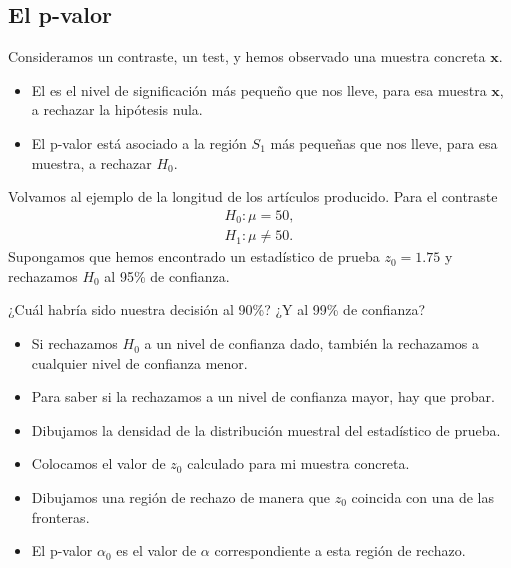 \subsection{El p-valor}
\begin{tcolorbox}[colback=blue!5!white, colframe=blue!75!black, title=\textbf{Definición}]
Consideramos un contraste, un test, y hemos observado una muestra concreta $\mathbf{x}$.
\begin{itemize}[label=\textbullet]
    \item El  es el nivel de significación más pequeño que nos lleve, para esa muestra $\mathbf{x}$, a rechazar la hipótesis nula.
    \item El p-valor está asociado a la región $S_1$ más pequeñas que nos lleve, para esa muestra, a rechazar $H_0$.
\end{itemize}
\end{tcolorbox}
\begin{tcolorbox}[colback=blue!5!white, colframe=blue!75!black, title=\textbf{Ejemplo}]
Volvamos al ejemplo de la longitud de los artículos producido. Para el contraste \[
    \begin{array}{l}
H_0:\mu=50,\\
        H_1:\mu\neq 50.
    \end{array}
\] Supongamos que hemos encontrado un estadístico de prueba $z_0=1.75$ y rechazamos $H_0$ al 95\% de confianza.

¿Cuál habría sido nuestra decisión al 90\%? ¿Y al 99\% de confianza?
\end{tcolorbox}
\begin{tcolorbox}[colback=olive!5!white, colframe=olive!75!black, title=\textbf{Importante}]
\begin{itemize}[label=\textbullet]
    \item Si rechazamos $H_0$ a un nivel de confianza dado, también la rechazamos a cualquier nivel de confianza menor.
    \item Para saber si la rechazamos a un nivel de confianza mayor, hay que probar.
\end{itemize}
\end{tcolorbox}
\begin{tcolorbox}[colback=blue!5!white, colframe=blue!75!black, title=\textbf{Para calcularlo:}]
\begin{itemize}[label=\textbullet]
    \item Dibujamos la densidad de la distribución muestral del estadístico de prueba.
    \item Colocamos el valor de $z_0$ calculado para mi muestra concreta.
    \item Dibujamos una región de rechazo de manera que $z_0$ coincida con una de las fronteras.
    \item El p-valor $\alpha_0$ es el valor de $\alpha$ correspondiente a esta región de rechazo.
\end{itemize}
\end{tcolorbox}
